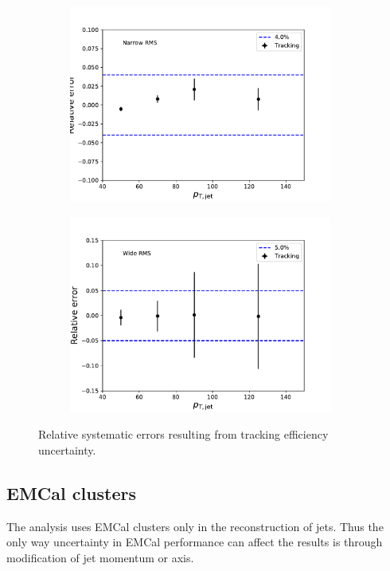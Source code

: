 \begin{figure}
\centering
\begin{subfigure}{0.45\textwidth}
\includegraphics[width=0.95\textwidth]{figures/systematics/SystematicErrorsGausRMS_Tracking.pdf}
\end{subfigure}
\begin{subfigure}{0.45\textwidth}
\includegraphics[width=0.95\textwidth]{figures/systematics/SystematicErrorsGammaRMS_Tracking.pdf}
\end{subfigure}
\caption{Relative systematic errors resulting from tracking efficiency uncertainty.}
\label{fig:systtrack2}
\end{figure}

\subsection{EMCal clusters}
The analysis uses EMCal clusters only in the reconstruction of jets. Thus the only way uncertainty in EMCal performance can affect the results is through modification of jet momentum or axis.
  
